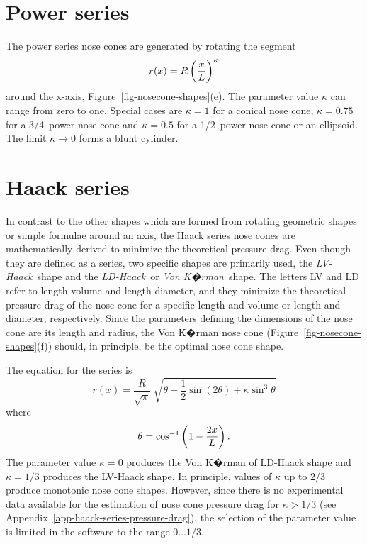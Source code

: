 \section{Power series}
\label{app-power-series}

The power series nose cones are generated by rotating the segment
%
\begin{equation}
r(x) = R\del{\frac{x}{L}}^\kappa
\end{equation}
%
around the x-axis, Figure~\ref{fig-nosecone-shapes}(e).  The parameter
value $\kappa$ can range from zero to one.  Special cases are
$\kappa=1$ for a conical nose cone, $\kappa=0.75$ for a 3/4~power nose
cone and $\kappa=0.5$ for a 1/2~power nose cone or an ellipsoid.
The limit $\kappa\rightarrow0$ forms a blunt cylinder.


\section{Haack series}

In contrast to the other shapes which are formed from rotating
geometric shapes or simple formulae around an axis, the Haack series
nose cones are mathematically derived to minimize the theoretical
pressure drag.  Even though they are defined as a series, two specific
shapes are primarily used, the {\it LV-Haack}\ shape and the 
{\it LD-Haack}\ or {\it Von K�rman}\ shape.  The letters LV and LD
refer to length-volume and length-diameter, and they minimize the
theoretical pressure drag of the nose cone for a specific length and
volume or length and diameter, respectively.  Since the parameters
defining the dimensions of the nose cone are its length and radius,
the Von K�rman nose cone (Figure~\ref{fig-nosecone-shapes}(f)) should,
in principle, be the optimal nose cone shape.

The equation for the series is
%
\begin{equation}
r(x) = \frac{R}{\sqrt{\pi}} \;
  \sqrt{\theta - \frac{1}{2}\sin(2\theta) + \kappa \sin^3\theta}
\end{equation}
%
where
%
\begin{equation}
\theta = \cos^{-1} \del{1-\frac{2x}{L}}.
\end{equation}
%
The parameter value $\kappa=0$ produces the Von K�rman of LD-Haack
shape and $\kappa=1/3$ produces the LV-Haack shape.  In principle,
values of $\kappa$ up to $2/3$ produce monotonic nose cone shapes.
However, since there is no experimental data available for the
estimation of nose cone pressure drag for $\kappa > 1/3$ (see
Appendix~\ref{app-haack-series-pressure-drag}), the selection of the
parameter value is limited in the software to the range 
$0 \ldots 1/3$.


